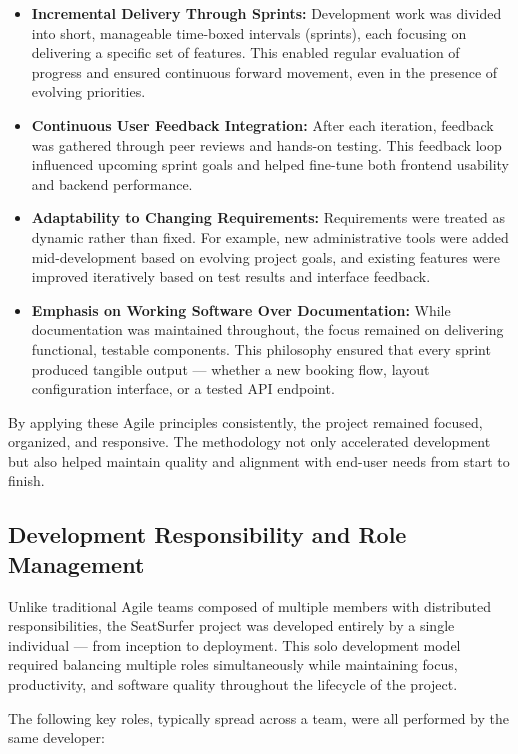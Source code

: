 \documentclass[12pt,a4paper]{report} %
\begin{document}
\begin{itemize}
\item \textbf{Incremental Delivery Through Sprints:}
Development work was divided into short, manageable time-boxed intervals (sprints), each focusing on delivering a specific set of features. This enabled regular evaluation of progress and ensured continuous forward movement, even in the presence of evolving priorities.
\item \textbf{Continuous User Feedback Integration:}  
After each iteration, feedback was gathered through peer reviews and hands-on testing. This feedback loop influenced upcoming sprint goals and helped fine-tune both frontend usability and backend performance.
\item \textbf{Adaptability to Changing Requirements:}  
Requirements were treated as dynamic rather than fixed. For example, new administrative tools were added mid-development based on evolving project goals, and existing features were improved iteratively based on test results and interface feedback.
\item \textbf{Emphasis on Working Software Over Documentation:}  
While documentation was maintained throughout, the focus remained on delivering functional, testable components. This philosophy ensured that every sprint produced tangible output — whether a new booking flow, layout configuration interface, or a tested API endpoint.
\end{itemize}

By applying these Agile principles consistently, the project remained focused, organized, and responsive. The methodology not only accelerated development but also helped maintain quality and alignment with end-user needs from start to finish.

\subsection{Development Responsibility and Role Management}

Unlike traditional Agile teams composed of multiple members with distributed responsibilities, the SeatSurfer project was developed entirely by a single individual — from inception to deployment. This solo development model required balancing multiple roles simultaneously while maintaining focus, productivity, and software quality throughout the lifecycle of the project.

The following key roles, typically spread across a team, were all performed by the same developer:
\end{document}
